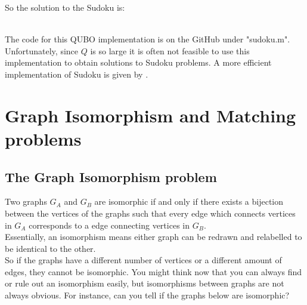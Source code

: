\documentclass{article}
\begin{document}
\noindent So the solution to the Sudoku is:

\hspace{92pt}\begin{lpsudoku}[scale=0.5]
\end{lpsudoku}\\

\noindent The code for this QUBO implementation is on the GitHub under "sudoku.m".\\
 
\noindent Unfortunately, since \(Q\) is so large it is often not feasible to use this implementation to obtain solutions to Sudoku problems. A more efficient implementation of Sudoku is given by \cite{mücke2024sudoku}.

\section{Graph Isomorphism and Matching problems}
\subsection{The Graph Isomorphism problem}
Two graphs \(G_A\) and \(G_B\) are isomorphic if and only if there exists a bijection between the vertices of the graphs such that every edge which connects vertices in \(G_A\) corresponds to a edge connecting vertices in \(G_B\). \\
Essentially, an isomorphism means either graph can be redrawn and relabelled to be identical to the other. \\

\noindent So if the graphs have a different number of vertices or a different amount of edges, they cannot be isomorphic. You might think now that you can always find or rule out an isomorphism easily, but isomorphisms between graphs are not always obvious. For instance, can you tell if the graphs below are isomorphic?\\
\end{document}

